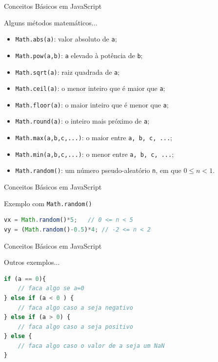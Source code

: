 \documentclass[xcolor=dvipsnames,table]{beamer}
\begin{document}
\begin{frame}[fragile]{Conceitos Básicos em JavaScript}
\begin{block}{Alguns métodos matemáticos...}
\begin{itemize}
\item {\tt Math.abs(a)}: valor absoluto de {\tt a}; \pause
\item {\tt Math.pow(a,b)}: {\tt a} elevado à potência de {\tt b}; \pause
\item {\tt Math.sqrt(a)}: raiz quadrada de {\tt a}; \pause
\item {\tt Math.ceil(a)}: o menor inteiro que é maior que {\tt a}; \pause
\item {\tt Math.floor(a)}: o maior inteiro que é menor que {\tt a}; \pause
\item {\tt Math.round(a)}: o inteiro mais próximo de {\tt a}; \pause 
\item {\tt Math.max(a,b,c,...)}: o maior entre {\tt a, b, c, ...}; \pause
\item {\tt Math.min(a,b,c,...)}: o menor entre {\tt a, b, c, ...}; \pause
\item {\tt Math.random()}: um número pseudo-aleatório {\tt n}, em que $0 \leq n < 1$.
\end{itemize}
\end{block}
\end{frame}

\begin{frame}[fragile]{Conceitos Básicos em JavaScript}
\begin{block}{Exemplo com {\tt Math.random()}}
\begin{lstlisting}[language=JavaScript]
vx = Math.random()*5;	// 0 <= n < 5
vy = (Math.random()-0.5)*4;	// -2 <= n < 2
\end{lstlisting}	
\end{block}
\end{frame}

\begin{frame}[fragile]{Conceitos Básicos em JavaScript}
\begin{block}{Outros exemplos...}
\begin{lstlisting}[language=JavaScript]
if (a == 0){
	// faca algo se a=0
} else if (a < 0 ) {
	// faca algo caso a seja negativo
} else if (a > 0) {
	// faca algo caso a seja positivo
} else {
	// faca algo caso o valor de a seja um NaN
}
\end{lstlisting}	
\end{block}
\end{frame}
\end{document}
